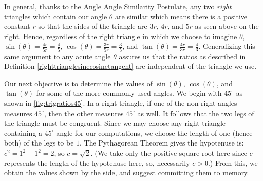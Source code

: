 In general, thanks to the  \href{https://en.wikipedia.org/wiki/AA_postulate}{\underline{Angle Angle Similarity Postulate}},  any two \textit{right} triangles which contain our angle $\theta$ are similar which means there is a positive constant $r$ so that the sides of the triangle are $3r$, $4r$, and $5r$ as seen above on the right.  Hence, regardless of the right triangle in which we choose to imagine $\theta$,  $\sin(\theta) = \frac{4r}{5r} = \frac{4}{5}$, $\cos(\theta) = \frac{3r}{5r} = \frac{3}{5}$, and $\tan(\theta) = \frac{4r}{3r}  = \frac{4}{3}$.  Generalizing this same argument to any acute angle $\theta$ assures us that the ratios as described in Definition \ref{righttrianglesinecosinetangent} are independent of the triangle we use.

Our next objective is to determine the values of $\sin(\theta)$, $\cos(\theta)$, and $\tan(\theta)$ for some of the more commonly used angles.  We begin with $45^{\circ}$ as shown in \autoref{fig:trigratios45}.  In a right triangle, if one of the non-right angles measures $45^{\circ}$, then the other measures $45^{\circ}$ as well.  It follows that the two legs of the triangle must be congruent.  Since we may choose any right triangle containing a $45^{\circ}$ angle for our computations, we choose the length of one (hence both) of the legs to be $1$.  The Pythagorean Theorem gives the hypotenuse is:  $c^2 = 1^2+1^2 = 2$, so $c = \sqrt{2}$. (We take only the positive square root here since $c$ represents the length of the hypotenuse here, so, necessarily $c>0$.)  From this, we obtain the values shown by the side, and suggest committing them to memory. 

